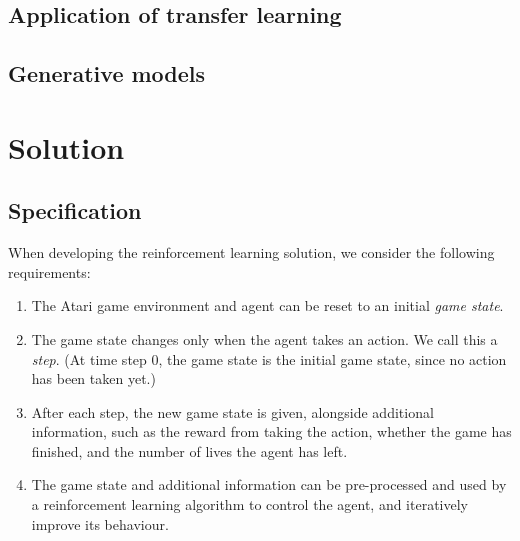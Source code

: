 \documentclass[12pt,a4paper]{article}
\begin{document}
\subsection{Application of transfer learning }

\subsection{Generative models}

\newpage
\section{Solution}
\subsection{Specification}
When developing the reinforcement learning solution, we consider the following requirements:
\begin{enumerate}
    \item The Atari game environment and agent can be reset to an initial \emph{game state}. 
    \item The game state changes only when the agent takes an action. We call this a \emph{step}. (At time step 0, the game state is the initial game state, since no action has been taken yet.)
    \item After each step, the new game state is given, alongside additional information, such as the reward from taking the action, whether the game has finished, and the number of lives the agent has left. 
    \item The game state and additional information can be pre-processed and used by a reinforcement learning algorithm to control the agent, and iteratively improve its behaviour.
\end{enumerate}


\end{document}
